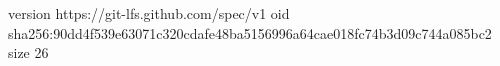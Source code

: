 version https://git-lfs.github.com/spec/v1
oid sha256:90dd4f539e63071c320cdafe48ba5156996a64cae018fc74b3d09c744a085bc2
size 26
